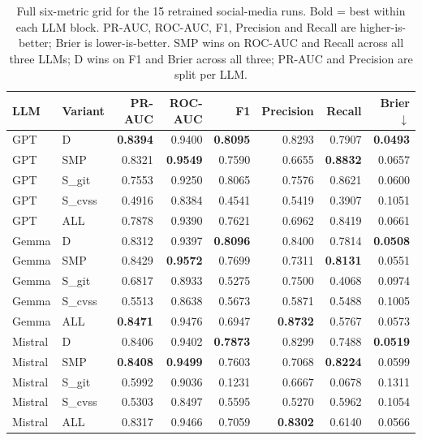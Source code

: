 \documentclass[11pt,a4paper]{article}
\begin{document}
\begin{table}[!htbp]
\centering\small
\setlength{\tabcolsep}{4pt}
\begin{tabular}{l l r r r r r r}
\toprule
LLM & Variant & PR-AUC & ROC-AUC & F1 & Precision & Recall & Brier $\downarrow$ \\
\midrule
GPT     & D       & \textbf{0.8394} & 0.9400          & \textbf{0.8095} & 0.8293          & 0.7907          & \textbf{0.0493} \\
GPT     & SMP     & 0.8321          & \textbf{0.9549} & 0.7590          & 0.6655          & \textbf{0.8832} & 0.0657          \\
GPT     & S\_git  & 0.7553          & 0.9250          & 0.8065          & 0.7576          & 0.8621          & 0.0600          \\
GPT     & S\_cvss & 0.4916          & 0.8384          & 0.4541          & 0.5419          & 0.3907          & 0.1051          \\
GPT     & ALL     & 0.7878          & 0.9390          & 0.7621          & 0.6962          & 0.8419          & 0.0661          \\
\midrule
Gemma   & D       & 0.8312          & 0.9397          & \textbf{0.8096} & 0.8400          & 0.7814          & \textbf{0.0508} \\
Gemma   & SMP     & 0.8429          & \textbf{0.9572} & 0.7699          & 0.7311          & \textbf{0.8131} & 0.0551          \\
Gemma   & S\_git  & 0.6817          & 0.8933          & 0.5275          & 0.7500          & 0.4068          & 0.0974          \\
Gemma   & S\_cvss & 0.5513          & 0.8638          & 0.5673          & 0.5871          & 0.5488          & 0.1005          \\
Gemma   & ALL     & \textbf{0.8471} & 0.9476          & 0.6947          & \textbf{0.8732} & 0.5767          & 0.0573          \\
\midrule
Mistral & D       & 0.8406          & 0.9402          & \textbf{0.7873} & 0.8299          & 0.7488          & \textbf{0.0519} \\
Mistral & SMP     & \textbf{0.8408} & \textbf{0.9499} & 0.7603          & 0.7068          & \textbf{0.8224} & 0.0599          \\
Mistral & S\_git  & 0.5992          & 0.9036          & 0.1231          & 0.6667          & 0.0678          & 0.1311          \\
Mistral & S\_cvss & 0.5303          & 0.8497          & 0.5595          & 0.5270          & 0.5962          & 0.1054          \\
Mistral & ALL     & 0.8317          & 0.9466          & 0.7059          & \textbf{0.8302} & 0.6140          & 0.0566          \\
\bottomrule
\end{tabular}
\caption{Full six-metric grid for the 15 retrained
social-media runs. Bold = best within each LLM block. PR-AUC,
ROC-AUC, F1, Precision and Recall are higher-is-better;
Brier is lower-is-better. SMP wins on ROC-AUC and Recall
across all three LLMs; D wins on F1 and Brier across all
three; PR-AUC and Precision are split per LLM.}
\label{tab:smp-full}
\end{table}
\end{document}
